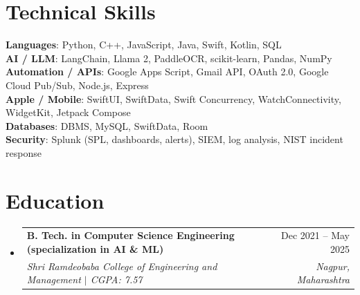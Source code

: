 \documentclass[a4paper,11pt]{article}
\makeatletter
\newcommand{\resumeSubheading}[4]{
  \vspace{-1pt}\item
    \begin{tabularx}{0.97\textwidth}[t]{@{}>{\raggedright\arraybackslash}X@{\hspace{0.75em}}r@{}}
      \textbf{#1} & #2 \\
      \textit{\small#3} & \textit{\small #4} \\
    \end{tabularx}\vspace{-3pt}
}
\newcommand{\resumeSubItemListStart}{\begin{itemize}[leftmargin=0.15in, label={}]}
\newcommand{\resumeSubItemListEnd}{\end{itemize}}
\makeatother
\begin{document}
\section{Technical Skills}
  \begin{itemize}[leftmargin=0.15in, label={}]
    \small{\item{
      \textbf{Languages}{: Python, C++, JavaScript, Java, Swift, Kotlin, SQL} \\
      \textbf{AI / LLM}{: LangChain, Llama 2, PaddleOCR, scikit-learn, Pandas, NumPy} \\
      \textbf{Automation / APIs}{: Google Apps Script, Gmail API, OAuth 2.0, Google Cloud Pub/Sub, Node.js, Express} \\
      \textbf{Apple / Mobile}{: SwiftUI, SwiftData, Swift Concurrency, WatchConnectivity, WidgetKit, Jetpack Compose} \\
      \textbf{Databases}{: DBMS, MySQL, SwiftData, Room} \\
      \textbf{Security}{: Splunk (SPL, dashboards, alerts), SIEM, log analysis, NIST incident response}
    }}
  \end{itemize}

\section{Education}
  \resumeSubItemListStart
    \resumeSubheading
      {B. Tech. in Computer Science Engineering (specialization in AI \& ML)}{Dec 2021 -- May 2025}
      {Shri Ramdeobaba College of Engineering and Management $|$ CGPA: 7.57}{Nagpur, Maharashtra}
  \resumeSubItemListEnd
\end{document}
